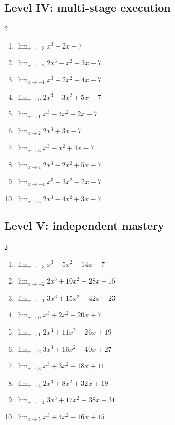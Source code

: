 \documentclass[11pt,oneside]{book}
\begin{document}
\subsection*{Level IV: multi-stage execution}
\begin{multicols}{2}
\begin{enumerate}[leftmargin=*,label=\textbf{\arabic*.},itemsep=0.65\baselineskip]
\item $\displaystyle \lim_{x \to -3} x^{3} + 2 x - 7$
\item $\displaystyle \lim_{x \to -2} 2 x^{3} - x^{2} + 3 x - 7$
\item $\displaystyle \lim_{x \to -1} x^{3} - 2 x^{2} + 4 x - 7$
\item $\displaystyle \lim_{x \to 0} 2 x^{3} - 3 x^{2} + 5 x - 7$
\item $\displaystyle \lim_{x \to 1} x^{3} - 4 x^{2} + 2 x - 7$
\item $\displaystyle \lim_{x \to 2} 2 x^{3} + 3 x - 7$
\item $\displaystyle \lim_{x \to 3} x^{3} - x^{2} + 4 x - 7$
\item $\displaystyle \lim_{x \to 4} 2 x^{3} - 2 x^{2} + 5 x - 7$
\item $\displaystyle \lim_{x \to -4} x^{3} - 3 x^{2} + 2 x - 7$
\item $\displaystyle \lim_{x \to 5} 2 x^{3} - 4 x^{2} + 3 x - 7$
\end{enumerate}
\end{multicols}
\subsection*{Level V: independent mastery}
\begin{multicols}{2}
\begin{enumerate}[leftmargin=*,label=\textbf{\arabic*.},itemsep=0.65\baselineskip]
\item $\displaystyle \lim_{x \to -3} x^{3} + 5 x^{2} + 14 x + 7$
\item $\displaystyle \lim_{x \to -2} 2 x^{3} + 10 x^{2} + 28 x + 15$
\item $\displaystyle \lim_{x \to -1} 3 x^{3} + 15 x^{2} + 42 x + 23$
\item $\displaystyle \lim_{x \to 0} x^{3} + 2 x^{2} + 20 x + 7$
\item $\displaystyle \lim_{x \to 1} 2 x^{3} + 11 x^{2} + 26 x + 19$
\item $\displaystyle \lim_{x \to 2} 3 x^{3} + 16 x^{2} + 40 x + 27$
\item $\displaystyle \lim_{x \to 3} x^{3} + 3 x^{2} + 18 x + 11$
\item $\displaystyle \lim_{x \to 4} 2 x^{3} + 8 x^{2} + 32 x + 19$
\item $\displaystyle \lim_{x \to -4} 3 x^{3} + 17 x^{2} + 38 x + 31$
\item $\displaystyle \lim_{x \to 5} x^{3} + 4 x^{2} + 16 x + 15$
\end{enumerate}
\end{multicols}
\end{document}
